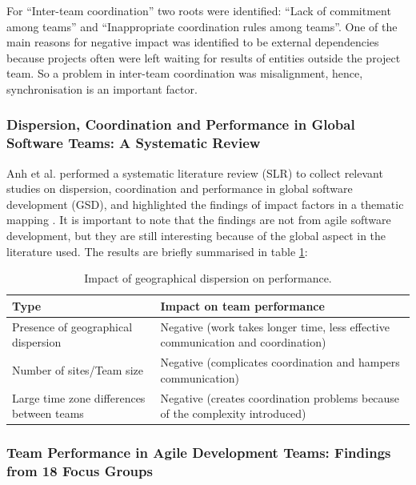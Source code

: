 For ``Inter-team coordination'' two roots were identified: ``Lack of commitment among teams'' and ``Inappropriate coordination rules among teams''. One of the main reasons for negative impact was identified to be external dependencies because projects often were left waiting for results of entities outside the project team. So a problem in inter-team coordination was misalignment, hence, synchronisation is an important factor.

\subsubsection{Dispersion, Coordination and Performance in Global Software Teams: A Systematic Review}

Anh et al. performed a systematic literature review (SLR) to collect relevant studies on dispersion, coordination and performance in global software development (GSD), and highlighted the findings of impact factors in a thematic mapping \cite{Anh2012}. It is important to note that the findings are not from agile software development, but they are still interesting because of the global aspect in the literature used. The results are briefly summarised in table \ref{GSD}:

\begin{table}[H]
\begin{center}
    \begin{tabular}{ | p{5cm} | p{8cm} |}
    \hline
    \textbf{Type} & \textbf{Impact on team performance} \\ \hline
    Presence of geographical dispersion & Negative (work takes longer time, less effective communication and coordination) \\ \hline
    Number of sites/Team size & Negative (complicates coordination and hampers communication) \\ \hline
    Large time zone differences between teams & Negative (creates coordination problems because of the complexity introduced) \\ \hline
    \end{tabular}
    \caption{Impact of geographical dispersion on performance.}
    \label{GSD}
\end{center}
\end{table}

\subsubsection{Team Performance in Agile Development Teams: Findings from 18 Focus Groups}

